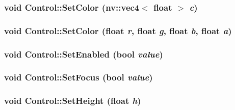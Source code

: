 \hypertarget{class_control_744d8882bf83d7848f5110ad0b9d6a3c}{
\subsubsection[{SetColor}]{\setlength{\rightskip}{0pt plus 5cm}void Control::SetColor ({\bf nv::vec4}$<$ float $>$ {\em c})}}
\label{class_control_744d8882bf83d7848f5110ad0b9d6a3c}


\hypertarget{class_control_54d417ec0a6f98f6a980e88553a89ff3}{
\subsubsection[{SetColor}]{\setlength{\rightskip}{0pt plus 5cm}void Control::SetColor (float {\em r}, \/  float {\em g}, \/  float {\em b}, \/  float {\em a})}}
\label{class_control_54d417ec0a6f98f6a980e88553a89ff3}


\hypertarget{class_control_6a9b9a9aeef0ede05d1e3a238eab972e}{
\subsubsection[{SetEnabled}]{\setlength{\rightskip}{0pt plus 5cm}void Control::SetEnabled (bool {\em value})}}
\label{class_control_6a9b9a9aeef0ede05d1e3a238eab972e}


\hypertarget{class_control_5394421a4554421d16c8e9cee70ee861}{
\subsubsection[{SetFocus}]{\setlength{\rightskip}{0pt plus 5cm}void Control::SetFocus (bool {\em value})}}
\label{class_control_5394421a4554421d16c8e9cee70ee861}


\hypertarget{class_control_e2199949a3bbb73abf5d59d48aa7aad5}{
\subsubsection[{SetHeight}]{\setlength{\rightskip}{0pt plus 5cm}void Control::SetHeight (float {\em h})}}
\label{class_control_e2199949a3bbb73abf5d59d48aa7aad5}


